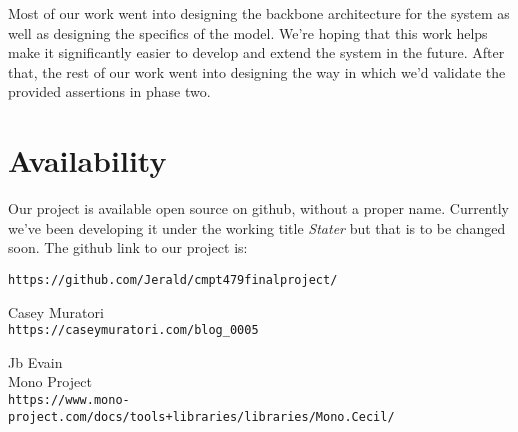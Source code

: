 \documentclass[letterpaper,twocolumn,10pt]{article}
\begin{document}
Most of our work went into designing the backbone architecture for the system as well as designing the specifics of the model. We're hoping that this work helps make it significantly easier to develop and extend the system in the future. After that, the rest of our work went into designing the way in which we'd validate the provided assertions in phase two.

\newpage

\section{Availability}

Our project is available open source on github, without a proper name. Currently we've been developing it under the working title \textit{Stater} but that is to be changed soon. The github link to our project is:
\begin{center}
{\tt https://github.com/Jerald/cmpt479finalproject/}\\
\end{center}

\clearpage

\begin{thebibliography}{9}
    Casey Muratori\\
    \texttt{https://caseymuratori.com/blog\_0005}

    Jb Evain\\
    Mono Project\\
    \texttt{https://www.mono-project.com/docs/tools+libraries/libraries/Mono.Cecil/}
\end{thebibliography}


\theendnotes
\end{document}
